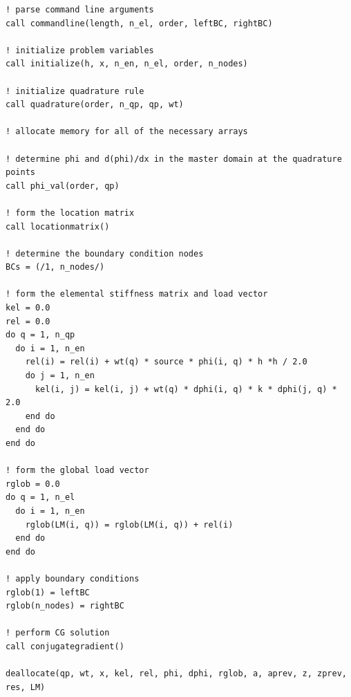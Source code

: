 \documentclass[10pt]{article}
\begin{document}
\begin{lstlisting}
! parse command line arguments
call commandline(length, n_el, order, leftBC, rightBC)

! initialize problem variables
call initialize(h, x, n_en, n_el, order, n_nodes)  

! initialize quadrature rule    
call quadrature(order, n_qp, qp, wt)      

! allocate memory for all of the necessary arrays             

! determine phi and d(phi)/dx in the master domain at the quadrature points
call phi_val(order, qp)

! form the location matrix
call locationmatrix()

! determine the boundary condition nodes
BCs = (/1, n_nodes/)

! form the elemental stiffness matrix and load vector
kel = 0.0
rel = 0.0
do q = 1, n_qp
  do i = 1, n_en
    rel(i) = rel(i) + wt(q) * source * phi(i, q) * h *h / 2.0
    do j = 1, n_en
      kel(i, j) = kel(i, j) + wt(q) * dphi(i, q) * k * dphi(j, q) * 2.0
    end do
  end do
end do

! form the global load vector
rglob = 0.0
do q = 1, n_el
  do i = 1, n_en
    rglob(LM(i, q)) = rglob(LM(i, q)) + rel(i)
  end do
end do

! apply boundary conditions
rglob(1) = leftBC
rglob(n_nodes) = rightBC

! perform CG solution
call conjugategradient()

deallocate(qp, wt, x, kel, rel, phi, dphi, rglob, a, aprev, z, zprev, res, LM)
\end{lstlisting}
\end{document}

